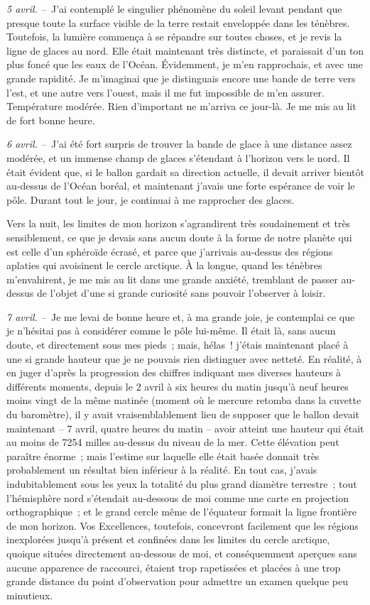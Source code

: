 \documentclass[french,twoside]{book} %
\begin{document}
\emph{5 avril. –} J’ai contemplé le singulier phénomène du soleil levant pendant que presque toute la surface visible de la terre restait enveloppée dans les ténèbres. Toutefois, la lumière commença à se répandre sur toutes choses, et je revis la ligne de glaces au nord. Elle était maintenant très distincte, et paraissait d’un ton plus foncé que les eaux de l’Océan. Évidemment, je m’en rapprochais, et avec une grande rapidité. Je m’imaginai que je distinguais encore une bande de terre vers l’est, et une autre vers l’ouest, mais il me fut impossible de m’en assurer. Température modérée. Rien d’important ne m’arriva ce jour-là. Je me mis au lit de fort bonne heure.\par
\emph{6 avril. –} J’ai été fort surpris de trouver la bande de glace à une distance assez modérée, et un immense champ de glaces s’étendant à l’horizon vers le nord. Il était évident que, si le ballon gardait sa direction actuelle, il devait arriver bientôt au-dessus de l’Océan boréal, et maintenant j’avais une forte espérance de voir le pôle. Durant tout le jour, je continuai à me rapprocher des glaces.\par
Vers la nuit, les limites de mon horizon s’agrandirent très soudainement et très sensiblement, ce que je devais sans aucun doute à la forme de notre planète qui est celle d’un sphéroïde écrasé, et parce que j’arrivais au-dessus des régions aplaties qui avoisinent le cercle arctique. À la longue, quand les ténèbres m’envahirent, je me mis au lit dans une grande anxiété, tremblant de passer au-dessus de l’objet d’une si grande curiosité sans pouvoir l’observer à loisir.\par
\emph{7 avril. –} Je me levai de bonne heure et, à ma grande joie, je contemplai ce que je n’hésitai pas à considérer comme le pôle lui-même. Il était là, sans aucun doute, et directement sous mes pieds ; mais, hélas ! j’étais maintenant placé à une si grande hauteur que je ne pouvais rien distinguer avec netteté. En réalité, à en juger d’après la progression des chiffres indiquant mes diverses hauteurs à différents moments, depuis le 2 avril à six heures du matin jusqu’à neuf heures moins vingt de la même matinée (moment où le mercure retomba dans la cuvette du baromètre), il y avait vraisemblablement lieu de supposer que le ballon devait maintenant – 7 avril, quatre heures du matin – avoir atteint une hauteur qui était au moins de 7254 milles au-dessus du niveau de la mer. Cette élévation peut paraître énorme ; mais l’estime sur laquelle elle était basée donnait très probablement un résultat bien inférieur à la réalité. En tout cas, j’avais indubitablement sous les yeux la totalité du plus grand diamètre terrestre ; tout l’hémisphère nord s’étendait au-dessous de moi comme une carte en projection orthographique ; et le grand cercle même de l’équateur formait la ligne frontière de mon horizon. Vos Excellences, toutefois, concevront facilement que les régions inexplorées jusqu’à présent et confinées dans les limites du cercle arctique, quoique situées directement au-dessous de moi, et conséquemment aperçues sans aucune apparence de raccourci, étaient trop rapetissées et placées à une trop grande distance du point d’observation pour admettre un examen quelque peu minutieux.\par
\end{document}
